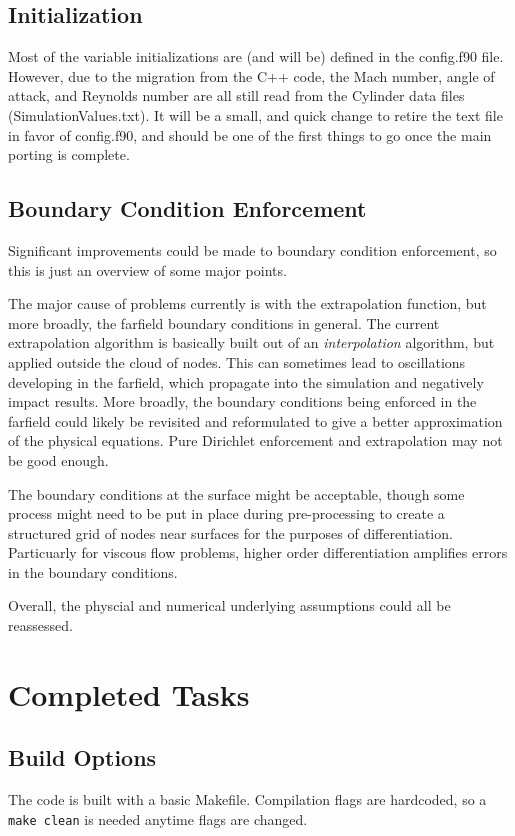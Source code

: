 \documentclass[12pt]{article}
\begin{document}
    \subsection{Initialization}
    Most of the variable initializations are (and will be) defined in the config.f90 file. However, due to the migration from the C++ code, the Mach number, angle of attack, and Reynolds number are all still read from the Cylinder data files (SimulationValues.txt). It will be a small, and quick change to retire the text file in favor of config.f90, and should be one of the first things to go once the main porting is complete.

\subsection{Boundary Condition Enforcement}
    Significant improvements could be made to boundary condition enforcement, so this is just an overview of some major points.
    
    The major cause of problems currently is with the extrapolation function, but more broadly, the farfield boundary conditions in general. The current extrapolation algorithm is basically built out of an \textit{interpolation} algorithm, but applied outside the cloud of nodes. This can sometimes lead to oscillations developing in the farfield, which propagate into the simulation and negatively impact results. More broadly, the boundary conditions being enforced in the farfield could likely be revisited and reformulated to give a better approximation of the physical equations. Pure Dirichlet enforcement and extrapolation may not be good enough.

    The boundary conditions at the surface might be acceptable, though some process might need to be put in place during pre-processing to create a structured grid of nodes near surfaces for the purposes of differentiation. Particuarly for viscous flow problems, higher order differentiation amplifies errors in the boundary conditions.

    Overall, the physcial and numerical underlying assumptions could all be reassessed.
    
    \newpage
    \section{Completed Tasks}

    \subsection{Build Options}
    The code is built with a basic Makefile. Compilation flags are hardcoded, so a \texttt{make clean} is needed anytime flags are changed.
\end{document}

